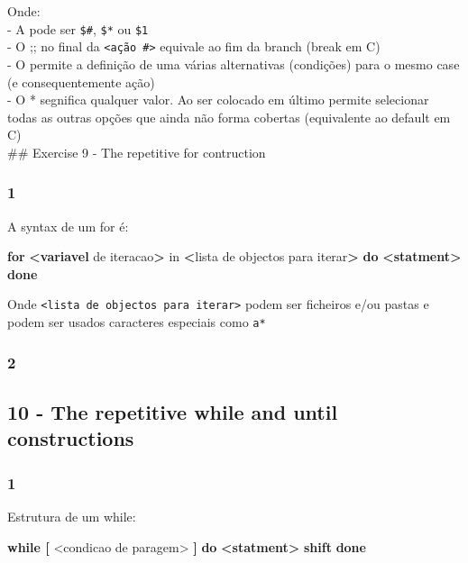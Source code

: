 \documentclass[]{article}
\newenvironment{Shaded}{}{}
\newcommand{\KeywordTok}[1]{\textcolor[rgb]{0.00,0.44,0.13}{\textbf{{#1}}}}
\newcommand{\OtherTok}[1]{\textcolor[rgb]{0.00,0.44,0.13}{{#1}}}
\newcommand{\NormalTok}[1]{{#1}}
\begin{document}
Onde:\\- A pode ser \texttt{\$\#}, \texttt{\$*} ou \texttt{\$1}\\- O ;;
no final da \texttt{\textless{}ação \#\textgreater{}} equivale ao fim da
branch (break em C)\\- O \textbar{} permite a definição de uma várias
alternativas (condições) para o mesmo case (e consequentemente ação)\\-
O * segnifica qualquer valor. Ao ser colocado em último permite
selecionar todas as outras opções que ainda não forma cobertas
(equivalente ao default em C)\\ \#\# Exercise 9 - The repetitive for
contruction

\subsubsection{1}\label{section-18}

A syntax de um for é:

\begin{Shaded}
\begin{Highlighting}[]
\KeywordTok{for} \KeywordTok{<variavel} \NormalTok{de iteracao}\KeywordTok{>} \NormalTok{in }\KeywordTok{<}\NormalTok{lista de objectos para iterar}\KeywordTok{>}
\KeywordTok{do}
    \KeywordTok{<statment>}
\KeywordTok{done}
\end{Highlighting}
\end{Shaded}

Onde \texttt{\textless{}lista de objectos para iterar\textgreater{}}
podem ser ficheiros e/ou pastas e podem ser usados caracteres especiais
como \texttt{a*}

\subsubsection{2}\label{section-19}

\subsection{10 - The repetitive while and until
constructions}\label{the-repetitive-while-and-until-constructions}

\subsubsection{1}\label{section-20}

Estrutura de um while:

\begin{Shaded}
\begin{Highlighting}[]
\KeywordTok{while [} \NormalTok{<condicao de paragem}\OtherTok{>}\KeywordTok{ ]}
\KeywordTok{do}
    \KeywordTok{<statment>}
    \KeywordTok{shift}
\KeywordTok{done}
\end{Highlighting}
\end{Shaded}
\end{document}
